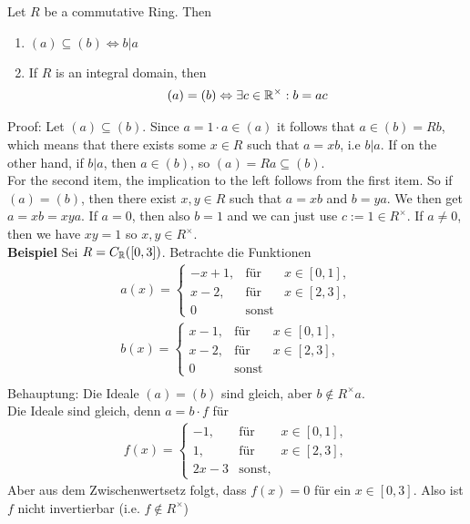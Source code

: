 \begin{lemma}[]
Let $R$ be a commutative Ring. Then
\begin{enumerate}
	\item $(a) \subseteq (b) \Leftrightarrow b | a$
	\item If $R$ is an integral domain, then
		\begin{align*}
			(a) = (b) \Leftrightarrow \exists c \in  \mathbb{R}^{\times}: b = ac
		\end{align*}
\end{enumerate}
\end{lemma}
Proof: Let $(a) \subseteq (b)$. Since $a = 1 \cdot a \in (a)$ it follows that $a \in (b) = Rb$, which means that there exists some $x \in R$ such that $a = xb$, i.e $b|a$. If on the other hand, if $b|a$, then $a \in (b)$, so $(a) = Ra \subseteq (b)$.\\
For the second item, the implication to the left follows from the first item. So if $(a) = (b)$, then there exist $x,y \in R$ such that $a = xb$ and $b = ya$. We then get $a = xb = xya$. If $a = 0$, then also $b = 1$ and we can just use $c := 1 \in R^{\times}$. If $a \neq 0$, then we have $xy = 1$ so $x,y \in R^{\times}$.\\


\textbf{Beispiel}  Sei $R = C_{\mathbb{R}}([0,3])$. Betrachte die Funktionen
\begin{align*}
	a(x) = \left\{\begin{array}{rcl}
			-x + 1, &\text{für}& x \in [0,1], \\
			x - 2, &\text{für}&  x \in [2,3],\\
			0 & \text{sonst}
	\end{array} \right.\\
	b(x) = \left\{\begin{array}{rcl}
			x - 1, &\text{für}& x \in [0,1], \\
			x - 2, &\text{für}&  x \in [2,3],\\
			0 & \text{sonst}
	\end{array} \right.\\
\end{align*}
Behauptung: Die Ideale $(a) = (b)$ sind gleich, aber $b \notin R^\times a$.\\
Die Ideale sind gleich, denn $a = b \cdot f$ für 
\begin{align*}
	f(x) = \left\{\begin{array}{rcl}
			-1, &\text{für}& x \in [0,1], \\
			1, &\text{für}&  x \in [2,3],\\
			2x - 3 & \text{sonst},
	\end{array} \right.
\end{align*}
Aber aus dem Zwischenwertsetz folgt, dass $f(x) = 0$ für ein $x \in [0,3]$. Also ist $f$ nicht invertierbar (i.e. $f \notin R^\times$)\\


